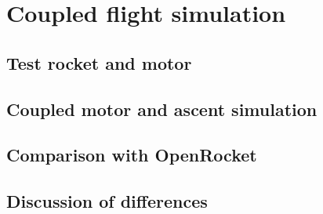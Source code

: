 \section{Coupled flight simulation}\label{sec:flight}

\subsection{Test rocket and motor}
\subsection{Coupled motor and ascent simulation}
\subsection{Comparison with OpenRocket}
\subsection{Discussion of differences}
